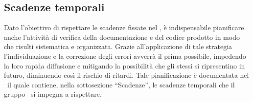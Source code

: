 \documentclass[../PianoDiQualifica.tex]{subfiles}
\begin{document}
		\subsection{Scadenze temporali}
			Dato l'obiettivo di rispettare le scadenze fissate nel \pianodiprogettov, è
			indispensabile pianificare anche l'attività di verifica della documentazione e del
			codice prodotto in modo che risulti sistematica e organizzata. Grazie
			all'applicazione di tale strategia l'individuazione e la correzione degli
			errori avverrà il prima possibile, impedendo la loro rapida diffusione e
			mitigando la possibilità che gli stessi si ripresentino in futuro,
			diminuendo così il rischio di ritardi. Tale pianificazione è documentata nel
			\pianodiprogettov\ il quale contiene, nella sottosezione ``Scadenze'', le
			scadenze temporali che il gruppo \kaleidoscode\ si impegna a rispettare.
\end{document}
